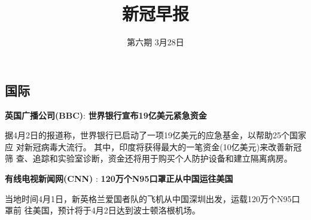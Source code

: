 \documentclass[
]{article}
\title{\textcolor{glaucous}{\Huge \textbf {新冠早报}}}
\subtitle{\textcolor{glaucous}{\Large 第六期 3月28日}}
\author{}
\date{\vspace{-2.5em}}
\begin{document}
\maketitle

\fontsize{13}{13}
\selectfont
\vspace{-10truemm}

\newcommand{\resheading}[1]{%
  \noindent\fcolorbox{lavenderblush}{lavenderblush}{\makebox[\dimexpr\textwidth-2\fboxsep-2\fboxrule][l]{\textbf{~#1}}}%
}

\pagestyle{fancyplain}

\renewcommand{\headrulewidth}{0pt}
\setlength{\headheight}{25pt}

%
  \noindent{}%

\hypertarget{section}{%
\subsection{\texorpdfstring{\textcolor{glaucous}{\Large 国际}}{}}\label{section}}

\textbf{\textcolor{glaucous}{英国广播公司(BBC)}}:
\textbf{世界银行宣布19亿美元紧急资金}

据4月2日的报道称，世界银行已启动了一项19亿美元的应急基金，以帮助25个国家应
对新冠病毒大流行。 其中，印度将获得最大的一笔资金(10亿美元)来改善新冠筛
查、追踪和实验室诊断，资金还将用于购买个人防护设备和建立隔离病房。

\textbf{\textcolor{glaucous}{有线电视新闻网(CNN)}} :
\textbf{120万个N95口罩正从中国运往美国}

当地时间4月1日，新英格兰爱国者队的飞机从中国深圳出发，运载120万个N95口罩前
往美国，预计将于4月2日达到波士顿洛根机场。
\end{document}
